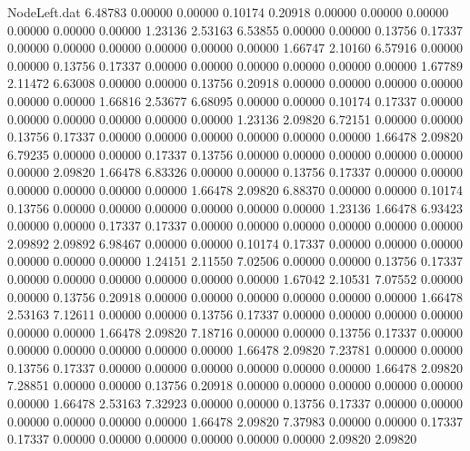 \begin{filecontents}{NodeLeft.dat}
   6.48783    0.00000    0.00000     0.10174    0.20918    0.00000    0.00000    0.00000    0.00000    0.00000    0.00000    1.23136    2.53163
   6.53855    0.00000    0.00000     0.13756    0.17337    0.00000    0.00000    0.00000    0.00000    0.00000    0.00000    1.66747    2.10160
   6.57916    0.00000    0.00000     0.13756    0.17337    0.00000    0.00000    0.00000    0.00000    0.00000    0.00000    1.67789    2.11472
   6.63008    0.00000    0.00000     0.13756    0.20918    0.00000    0.00000    0.00000    0.00000    0.00000    0.00000    1.66816    2.53677
   6.68095    0.00000    0.00000     0.10174    0.17337    0.00000    0.00000    0.00000    0.00000    0.00000    0.00000    1.23136    2.09820
   6.72151    0.00000    0.00000     0.13756    0.17337    0.00000    0.00000    0.00000    0.00000    0.00000    0.00000    1.66478    2.09820
   6.79235    0.00000    0.00000     0.17337    0.13756    0.00000    0.00000    0.00000    0.00000    0.00000    0.00000    2.09820    1.66478
   6.83326    0.00000    0.00000     0.13756    0.17337    0.00000    0.00000    0.00000    0.00000    0.00000    0.00000    1.66478    2.09820
   6.88370    0.00000    0.00000     0.10174    0.13756    0.00000    0.00000    0.00000    0.00000    0.00000    0.00000    1.23136    1.66478
   6.93423    0.00000    0.00000     0.17337    0.17337    0.00000    0.00000    0.00000    0.00000    0.00000    0.00000    2.09892    2.09892
   6.98467    0.00000    0.00000     0.10174    0.17337    0.00000    0.00000    0.00000    0.00000    0.00000    0.00000    1.24151    2.11550
   7.02506    0.00000    0.00000     0.13756    0.17337    0.00000    0.00000    0.00000    0.00000    0.00000    0.00000    1.67042    2.10531
   7.07552    0.00000    0.00000     0.13756    0.20918    0.00000    0.00000    0.00000    0.00000    0.00000    0.00000    1.66478    2.53163
   7.12611    0.00000    0.00000     0.13756    0.17337    0.00000    0.00000    0.00000    0.00000    0.00000    0.00000    1.66478    2.09820
   7.18716    0.00000    0.00000     0.13756    0.17337    0.00000    0.00000    0.00000    0.00000    0.00000    0.00000    1.66478    2.09820
   7.23781    0.00000    0.00000     0.13756    0.17337    0.00000    0.00000    0.00000    0.00000    0.00000    0.00000    1.66478    2.09820
   7.28851    0.00000    0.00000     0.13756    0.20918    0.00000    0.00000    0.00000    0.00000    0.00000    0.00000    1.66478    2.53163
   7.32923    0.00000    0.00000     0.13756    0.17337    0.00000    0.00000    0.00000    0.00000    0.00000    0.00000    1.66478    2.09820
   7.37983    0.00000    0.00000     0.17337    0.17337    0.00000    0.00000    0.00000    0.00000    0.00000    0.00000    2.09820    2.09820

\end{filecontents}
